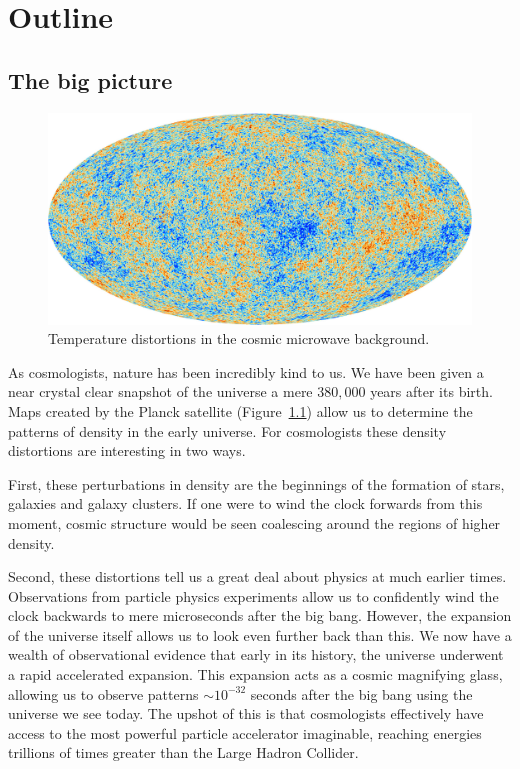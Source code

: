 \chapter{Outline}
\label{chp:out}

\section{The big picture}
\begin{figure}[tp]
  \includegraphics[width=\textwidth]{chapters/outline/figures/planck}
  \caption{Temperature distortions in the cosmic microwave background.}\label{fig:out:planck}
\end{figure}

As cosmologists, nature has been incredibly kind to us. We have been given a near crystal clear snapshot of the universe a mere \(380,000\) years after its birth. Maps created by the Planck satellite (Figure~\ref{fig:out:planck}) allow us to determine the patterns of density in the early universe. For cosmologists these density distortions are interesting in two ways. 

First, these perturbations in density are the beginnings of the formation of stars, galaxies and galaxy clusters. If one were to wind the clock forwards from this moment, cosmic structure would be seen coalescing around the regions of higher density.

Second, these distortions tell us a great deal about physics at much earlier times. Observations from particle physics experiments allow us to confidently wind the clock backwards to mere microseconds after the big bang.
However, the expansion of the universe itself allows us to look even further back than this. We now have a wealth of observational evidence that early in its history, the universe underwent a rapid accelerated expansion. This expansion acts as a cosmic magnifying glass, allowing us to observe patterns \(\sim10^{-32}\) seconds after the big bang using the universe we see today. The upshot of this is that cosmologists effectively have access to the most powerful particle accelerator imaginable, reaching energies trillions of times greater than the Large Hadron Collider. 

